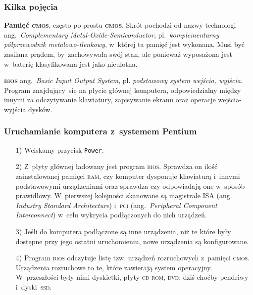 \documentclass[10pt,t]{beamer}
\begin{document}
\begin{frame}
  \frametitle{Kilka pojęcia}


  \textbf{Pamięć \textsc{cmos}}, często po prostu \textbf{\textsc{cmos}}.
  Skrót pochodzi od nazwy technologi ang.~\textit{Complementary
    Metal-Oxide-Semiconductor}, pl.~\textit{komplementarny półprzewodnik
    metalowo-tlenkowy}, w~której ta pamięć jest wykonana. Musi być zasilana
  prądem, by~zachowywała swój stan, ale ponieważ wyposażona jest w~baterię
  klasyfikowana jest jako nieulotna.

  \textbf{\textsc{bios}} ang.~\textit{Basic Input Output System}, pl.
  \textit{podstawowy system wejścia, wyjścia}. Program znajdujący~się
  na płycie głównej komputera, odpowiedzialny między innymi za odczytywanie
  klawiatury, zapisywanie ekranu oraz operacje wejścia-wyjścia dysków.

\end{frame}





\begin{frame}
  \frametitle{Uruchamianie komputera z~systemem Pentium}


  \begin{itemize}

  \item[1)] Wciskamy przycisk \texttt{Power}.



  \item[2)] Z~płyty głównej ładowany jest program \textsc{bios}. Sprawdza on
    ilość zainstalowanej pamięci \textsc{ram}, czy komputer dysponuje
    klawiaturą i~innymi podstawowymi urządzeniami oraz sprawdza czy
    odpowiadają one w~sposób prawidłowy. W~pierwszej kolejności skanowane
    są magistrale \textsc{ISA} (ang. \textit{Industry Standard
      Architecture}) i~\textsc{pci} (ang.~\textit{Peripheral Component
      Interconnect}) w~celu wykrycia podłączonych do nich urządzeń.



  \item[3)] Jeśli do komputera podłączone są inne urządzenia, niż te które
    były dostępne przy jego ostatni uruchomieniu, nowe urządzenia są
    konfigurowane.



  \item[4)] Program \textsc{bios} odczytuje listę tzw. urządzeń rozruchowych
    z~pamięci \textsc{cmos}. Urządzenia rozruchowe to te, które zawierają
    system operacyjny. W~przeszłości były nimi dyskietki, płyty
    \textsc{cd}-\textsc{rom}, \textsc{dvd}, dziś choćby pendriwy
    i~dyski~\textsc{ssd}.

  \end{itemize}

\end{frame}
\end{document}
